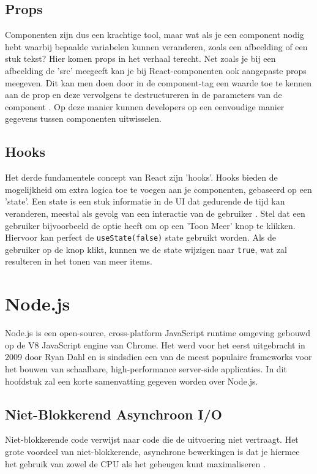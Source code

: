 \subsection{Props}
Componenten zijn dus een krachtige tool, maar wat als je een component nodig hebt waarbij bepaalde variabelen kunnen veranderen, zoals een afbeelding of een stuk tekst? Hier komen props in het verhaal terecht. Net zoals je bij een afbeelding de 'src' meegeeft kan je bij React-componenten ook aangepaste props meegeven. Dit kan men doen door in de component-tag een waarde toe te kennen aan de prop en deze vervolgens te destructureren in de parameters van de component \autocite{NextJS2023}. Op deze manier kunnen developers op een eenvoudige manier gegevens tussen componenten uitwisselen.

\subsection{Hooks}
Het derde fundamentele concept van React zijn 'hooks'. Hooks bieden de mogelijkheid om extra logica toe te voegen aan je componenten, gebaseerd op een 'state'. Een state is een stuk informatie in de UI dat gedurende de tijd kan veranderen, meestal als gevolg van een interactie van de gebruiker \autocite{NextJS2023}. Stel dat een gebruiker bijvoorbeeld de optie heeft om op een 'Toon Meer' knop te klikken. Hiervoor kan perfect de \texttt{useState(false)} state gebruikt worden. Als de gebruiker op de knop klikt, kunnen we de state wijzigen naar \texttt{true}, wat zal resulteren in het tonen van meer items.

\section{Node.js}

Node.js is een open-source, cross-platform JavaScript runtime omgeving gebouwd op de V8 JavaScript engine van Chrome. Het werd voor het eerst uitgebracht in 2009 door Ryan Dahl en is sindsdien een van de meest populaire frameworks voor het bouwen van schaalbare, high-performance server-side applicaties. \autocite{Sufiyan2023} In dit hoofdstuk zal een korte samenvatting gegeven worden over Node.js.

\subsection{Niet-Blokkerend Asynchroon I/O}

Niet-blokkerende code verwijst naar code die de uitvoering niet vertraagt. Het grote voordeel van niet-blokkerende, asynchrone bewerkingen is dat je hiermee het gebruik van zowel de CPU als het geheugen kunt maximaliseren \autocite{Sarkar2018}.

